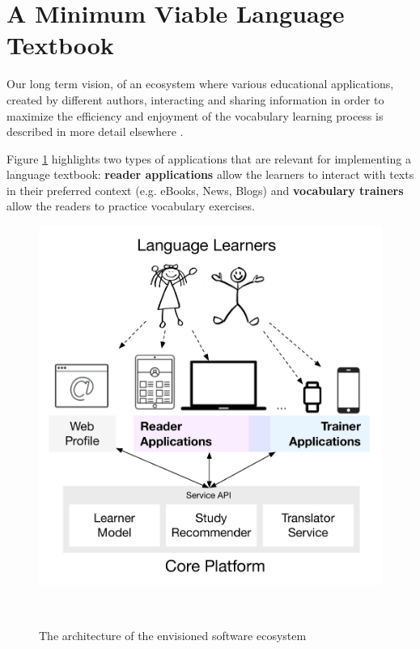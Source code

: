 
\newpage
\section{A Minimum Viable Language Textbook}
\label{sec:system}

Our long term vision, of an ecosystem where various educational applications, created by different authors, interacting and sharing information in order to maximize the efficiency and enjoyment of the vocabulary learning process is described in more detail elsewhere \cite{Lungu16}. 

Figure \ref{fig:architecture} highlights two types of applications that are relevant for implementing a language textbook: {\bf reader applications} allow the learners to interact with texts in their preferred context (e.g. eBooks, News, Blogs) and {\bf vocabulary trainers} allow the readers to practice vocabulary exercises. 

\begin{figure}[h!]
\centering
  \includegraphics[width=\columnwidth]{figures/zeeguu-architecture.pdf}
  \caption{The architecture of the envisioned software ecosystem}~\label{fig:architecture}
\end{figure}

